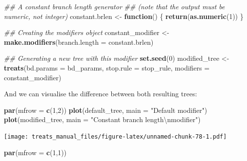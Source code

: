 \documentclass[
]{book}
\newenvironment{Shaded}{\begin{snugshade}}{\end{snugshade}}
\newcommand{\CharTok}[1]{\textcolor[rgb]{0.31,0.60,0.02}{#1}}
\newcommand{\CommentTok}[1]{\textcolor[rgb]{0.56,0.35,0.01}{\textit{#1}}}
\newcommand{\ControlFlowTok}[1]{\textcolor[rgb]{0.13,0.29,0.53}{\textbf{#1}}}
\newcommand{\DataTypeTok}[1]{\textcolor[rgb]{0.13,0.29,0.53}{#1}}
\newcommand{\DecValTok}[1]{\textcolor[rgb]{0.00,0.00,0.81}{#1}}
\newcommand{\KeywordTok}[1]{\textcolor[rgb]{0.13,0.29,0.53}{\textbf{#1}}}
\newcommand{\NormalTok}[1]{#1}
\newcommand{\StringTok}[1]{\textcolor[rgb]{0.31,0.60,0.02}{#1}}
\begin{document}
\begin{Shaded}
\begin{Highlighting}[]
\CommentTok{\#\# A constant branch length generator}
\CommentTok{\#\# (note that the output must be numeric, not integer)}
\NormalTok{constant.brlen \textless{}{-}}\StringTok{ }\ControlFlowTok{function}\NormalTok{() \{}
    \KeywordTok{return}\NormalTok{(}\KeywordTok{as.numeric}\NormalTok{(}\DecValTok{1}\NormalTok{))}
\NormalTok{\}}

\CommentTok{\#\# Creating the modifiers object}
\NormalTok{constant\_modifier \textless{}{-}}\StringTok{ }\KeywordTok{make.modifiers}\NormalTok{(}\DataTypeTok{branch.length =}\NormalTok{ constant.brlen)}

\CommentTok{\#\# Generating a new tree with this modifier}
\KeywordTok{set.seed}\NormalTok{(}\DecValTok{0}\NormalTok{)}
\NormalTok{modified\_tree \textless{}{-}}\StringTok{ }\KeywordTok{treats}\NormalTok{(}\DataTypeTok{bd.params =}\NormalTok{ bd\_params,}
                        \DataTypeTok{stop.rule =}\NormalTok{ stop\_rule,}
                        \DataTypeTok{modifiers =}\NormalTok{ constant\_modifier)}
\end{Highlighting}
\end{Shaded}

And we can visualise the difference between both resulting trees:

\begin{Shaded}
\begin{Highlighting}[]
\KeywordTok{par}\NormalTok{(}\DataTypeTok{mfrow =} \KeywordTok{c}\NormalTok{(}\DecValTok{1}\NormalTok{,}\DecValTok{2}\NormalTok{))}
\KeywordTok{plot}\NormalTok{(default\_tree,  }\DataTypeTok{main =} \StringTok{"Default modifier"}\NormalTok{)}
\KeywordTok{plot}\NormalTok{(modified\_tree, }\DataTypeTok{main =} \StringTok{"Constant branch length}\CharTok{\textbackslash{}n}\StringTok{modifier"}\NormalTok{)}
\end{Highlighting}
\end{Shaded}

\texttt{[image: treats\_manual\_files/figure-latex/unnamed-chunk-78-1.pdf]}

\begin{Shaded}
\begin{Highlighting}[]
\KeywordTok{par}\NormalTok{(}\DataTypeTok{mfrow =} \KeywordTok{c}\NormalTok{(}\DecValTok{1}\NormalTok{,}\DecValTok{1}\NormalTok{))}
\end{Highlighting}
\end{Shaded}
\end{document}
